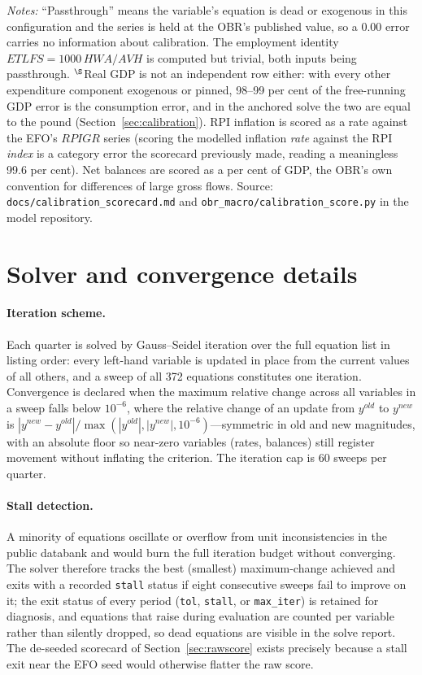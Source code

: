 \begin{table}[ht]
\medskip
\parbox{0.92\textwidth}{\footnotesize \emph{Notes:} ``Passthrough'' means the variable's equation is dead or exogenous in this configuration and the series is held at the OBR's published value, so a 0.00 error carries no information about calibration. The employment identity $ETLFS = 1000\,HWA/AVH$ is computed but trivial, both inputs being passthrough. $^{\S}$Real GDP is not an independent row either: with every other expenditure component exogenous or pinned, 98--99 per cent of the free-running GDP error is the consumption error, and in the anchored solve the two are equal to the pound (Section~\ref{sec:calibration}). RPI inflation is scored as a rate against the EFO's $RPIGR$ series (scoring the modelled inflation \emph{rate} against the RPI \emph{index} is a category error the scorecard previously made, reading a meaningless 99.6 per cent). Net balances are scored as a per cent of GDP, the OBR's own convention for differences of large gross flows. Source: \texttt{docs/calibration\_scorecard.md} and \texttt{obr\_macro/calibration\_score.py} in the model repository.}
\end{table}

\section{Solver and convergence details}
\label{app:solver}

\paragraph{Iteration scheme.} Each quarter is solved by Gauss--Seidel iteration over the full equation list in listing order: every left-hand variable is updated in place from the current values of all others, and a sweep of all 372 equations constitutes one iteration. Convergence is declared when the maximum relative change across all variables in a sweep falls below $10^{-6}$, where the relative change of an update from $y^{old}$ to $y^{new}$ is $|y^{new} - y^{old}| / \max(|y^{old}|, |y^{new}|, 10^{-6})$---symmetric in old and new magnitudes, with an absolute floor so near-zero variables (rates, balances) still register movement without inflating the criterion. The iteration cap is 60 sweeps per quarter.

\paragraph{Stall detection.} A minority of equations oscillate or overflow from unit inconsistencies in the public databank and would burn the full iteration budget without converging. The solver therefore tracks the best (smallest) maximum-change achieved and exits with a recorded \texttt{stall} status if eight consecutive sweeps fail to improve on it; the exit status of every period (\texttt{tol}, \texttt{stall}, or \texttt{max\_iter}) is retained for diagnosis, and equations that raise during evaluation are counted per variable rather than silently dropped, so dead equations are visible in the solve report. The de-seeded scorecard of Section~\ref{sec:rawscore} exists precisely because a stall exit near the EFO seed would otherwise flatter the raw score.

